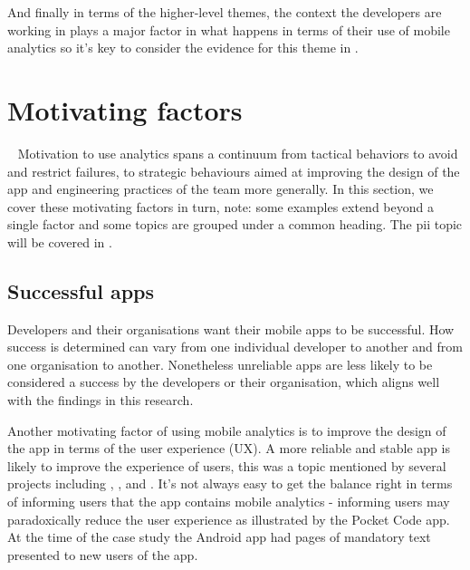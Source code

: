 And finally in terms of the higher-level themes, the context the developers are working in plays a major factor in what happens in terms of their use of mobile analytics so it's key to consider the evidence for this theme in .


\section{Motivating factors}~\label{aiu-motivating-factors-theme}
Motivation to use analytics spans a continuum from tactical behaviors to avoid and restrict failures, to strategic behaviours aimed at improving the design of the app and engineering practices of the team more generally.  In this section, we cover these motivating factors in turn, note: some examples extend beyond a single factor and some topics are grouped under a common heading. The \Gls{pii} topic will be covered in .

\subsection{Successful apps}\label{successful-apps-topic}
Developers and their organisations want their mobile apps to be successful. How success is determined can vary from one individual developer to another and from one organisation to another. Nonetheless unreliable apps are less likely to be considered a success by the developers or their organisation, which aligns well with the findings in this research.

Another motivating factor of using mobile analytics is to improve the design of the app in terms of the user experience (UX). A more reliable and stable app is likely to improve the experience of users, this was a topic mentioned by several projects including , , and . It's not always easy to get the balance right in terms of informing users that the app contains mobile analytics - informing users may paradoxically reduce the user experience as illustrated by the Pocket Code app. At the time of the case study the Android app had pages of mandatory text presented to new users of the app.

